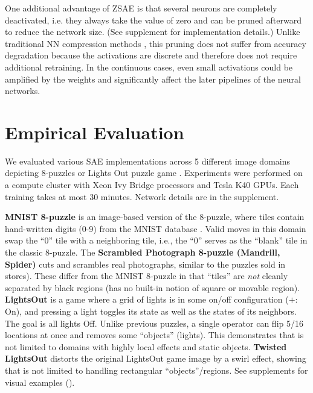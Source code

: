
One additional advantage of ZSAE is that
several neurons are completely deactivated, i.e. they always take the value of zero
and can be pruned afterward to reduce the network size.
(See supplement  for implementation details.)
Unlike traditional NN compression methods \cite{cheng2017survey}, this pruning does not suffer from
accuracy degradation because the activations are discrete and therefore does not require additional retraining.
In the continuous cases, even small activations could be amplified by the weights and significantly affect the
later pipelines of the neural networks.

\section{Empirical Evaluation}
\label{evaluation}

We evaluated various SAE implementations across 5 different
image domains depicting 8-puzzles or Lights Out puzzle game \cite{lightsout}.
Experiments were performed on a compute cluster with Xeon Ivy Bridge
processors and Tesla K40 GPUs.  Each training takes at most 30 minutes.
Network details are in the supplement.

\textbf{MNIST 8-puzzle}
is an image-based version of the 8-puzzle, where tiles contain hand-written digits (0-9) from the  MNIST database \cite{lecun1998gradient}.
Valid moves in this domain swap the ``0'' tile  with a neighboring tile, i.e., the ``0'' serves as the ``blank'' tile in the classic 8-puzzle. 
The \textbf{Scrambled Photograph 8-puzzle (Mandrill, Spider)} cuts and scrambles real photographs, similar to the puzzles sold in stores).
These differ from the MNIST 8-puzzle in that ``tiles'' are \textit{not} cleanly separated by black regions
(\latentplanner has no built-in notion of square or movable region).
\textbf{LightsOut} is
a game where a grid of lights is in some on/off configuration ($+$: On),
and pressing a light toggles its state as well as the states of its neighbors.
The goal is all lights Off.
Unlike previous puzzles, a single operator can flip 5/16 locations at once and
removes some ``objects'' (lights).
This demonstrates that \latentplanner is not limited to domains with highly local effects and static objects.
\textbf{Twisted LightsOut} distorts the original LightsOut game image by a swirl effect,
showing that \latentplanner is not limited to handling rectangular ``objects''/regions.
See supplements for visual examples ().

